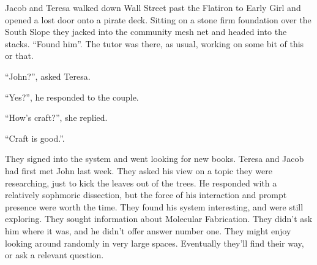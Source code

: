 

Jacob and Teresa walked down Wall Street past the Flatiron to Early
Girl and opened a lost door onto a pirate deck.  Sitting on a stone
firm foundation over the South Slope they jacked into the community
mesh net and headed into the stacks.  ``Found him''.  The tutor was
there, as usual, working on some bit of this or that.

``John?'', asked Teresa.

``Yes?'', he responded to the couple.

``How's craft?'', she replied.

``Craft is good.''.

They signed into the system and went looking for new books.  Teresa
and Jacob had first met John last week.  They asked his view on a
topic they were researching, just to kick the leaves out of the trees.
He responded with a relatively sophmoric dissection, but the force of
his interaction and prompt presence were worth the time.  They found
his system interesting, and were still exploring.  They sought
information about Molecular Fabrication.  They didn't ask him where it
was, and he didn't offer answer number one.  They might enjoy looking
around randomly in very large spaces.  Eventually they'll find their
way, or ask a relevant question.

\bye
